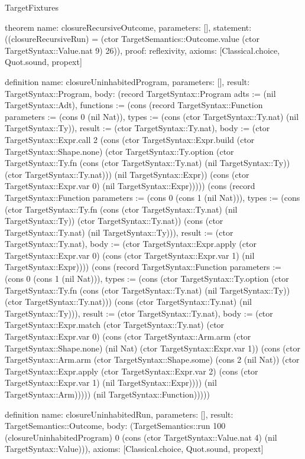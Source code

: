 \begin{lexlean}{TargetFixtures}
\begin{semanticmodule}
theorem{
  name: closureRecursiveOutcome,
  parameters: [],
  statement: ((closureRecursiveRun) = (ctor TargetSemantics::Outcome.value (ctor TargetSyntax::Value.nat 9) 26)),
  proof: reflexivity{},
  axioms: [Classical.choice, Quot.sound, propext]
}

definition{
  name: closureUninhabitedProgram,
  parameters: [],
  result: TargetSyntax::Program,
  body: (record TargetSyntax::Program {adts := (nil TargetSyntax::Adt), functions := (cons (record TargetSyntax::Function {parameters := (cons 0 (nil Nat)), types := (cons (ctor TargetSyntax::Ty.nat) (nil TargetSyntax::Ty)), result := (ctor TargetSyntax::Ty.nat), body := (ctor TargetSyntax::Expr.call 2 (cons (ctor TargetSyntax::Expr.build (ctor TargetSyntax::Shape.none) (ctor TargetSyntax::Ty.option (ctor TargetSyntax::Ty.fn (cons (ctor TargetSyntax::Ty.nat) (nil TargetSyntax::Ty)) (ctor TargetSyntax::Ty.nat))) (nil TargetSyntax::Expr)) (cons (ctor TargetSyntax::Expr.var 0) (nil TargetSyntax::Expr))))}) (cons (record TargetSyntax::Function {parameters := (cons 0 (cons 1 (nil Nat))), types := (cons (ctor TargetSyntax::Ty.fn (cons (ctor TargetSyntax::Ty.nat) (nil TargetSyntax::Ty)) (ctor TargetSyntax::Ty.nat)) (cons (ctor TargetSyntax::Ty.nat) (nil TargetSyntax::Ty))), result := (ctor TargetSyntax::Ty.nat), body := (ctor TargetSyntax::Expr.apply (ctor TargetSyntax::Expr.var 0) (cons (ctor TargetSyntax::Expr.var 1) (nil TargetSyntax::Expr)))}) (cons (record TargetSyntax::Function {parameters := (cons 0 (cons 1 (nil Nat))), types := (cons (ctor TargetSyntax::Ty.option (ctor TargetSyntax::Ty.fn (cons (ctor TargetSyntax::Ty.nat) (nil TargetSyntax::Ty)) (ctor TargetSyntax::Ty.nat))) (cons (ctor TargetSyntax::Ty.nat) (nil TargetSyntax::Ty))), result := (ctor TargetSyntax::Ty.nat), body := (ctor TargetSyntax::Expr.match (ctor TargetSyntax::Ty.nat) (ctor TargetSyntax::Expr.var 0) (cons (ctor TargetSyntax::Arm.arm (ctor TargetSyntax::Shape.none) (nil Nat) (ctor TargetSyntax::Expr.var 1)) (cons (ctor TargetSyntax::Arm.arm (ctor TargetSyntax::Shape.some) (cons 2 (nil Nat)) (ctor TargetSyntax::Expr.apply (ctor TargetSyntax::Expr.var 2) (cons (ctor TargetSyntax::Expr.var 1) (nil TargetSyntax::Expr)))) (nil TargetSyntax::Arm))))}) (nil TargetSyntax::Function))))})
}

definition{
  name: closureUninhabitedRun,
  parameters: [],
  result: TargetSemantics::Outcome,
  body: (TargetSemantics::run 100 (closureUninhabitedProgram) 0 (cons (ctor TargetSyntax::Value.nat 4) (nil TargetSyntax::Value))),
  axioms: [Classical.choice, Quot.sound, propext]
}


\end{semanticmodule}
\end{lexlean}
